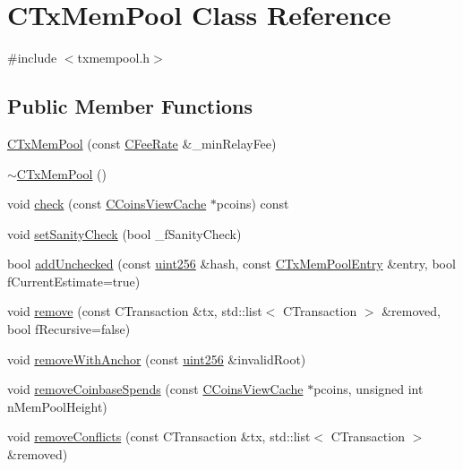 \hypertarget{class_c_tx_mem_pool}{}\section{C\+Tx\+Mem\+Pool Class Reference}
\label{class_c_tx_mem_pool}


{\ttfamily \#include $<$txmempool.\+h$>$}

\subsection*{Public Member Functions}
\begin{DoxyCompactItemize}
\item 
\mbox{\hyperlink{class_c_tx_mem_pool_a82147548cfa962975690d1926b717c1c}{C\+Tx\+Mem\+Pool}} (const \mbox{\hyperlink{class_c_fee_rate}{C\+Fee\+Rate}} \&\+\_\+min\+Relay\+Fee)
\item 
\mbox{\hyperlink{class_c_tx_mem_pool_a038108efea0c4312e5bed2ce064702b2}{$\sim$\+C\+Tx\+Mem\+Pool}} ()
\item 
void \mbox{\hyperlink{class_c_tx_mem_pool_ab30fadfa811829e79accca41da6a8328}{check}} (const \mbox{\hyperlink{class_c_coins_view_cache}{C\+Coins\+View\+Cache}} $\ast$pcoins) const
\item 
void \mbox{\hyperlink{class_c_tx_mem_pool_a1c0edb1fd5f0b02ddac46a6a97dcfd53}{set\+Sanity\+Check}} (bool \+\_\+f\+Sanity\+Check)
\item 
bool \mbox{\hyperlink{class_c_tx_mem_pool_aab557615eb380db41237382bab239f7c}{add\+Unchecked}} (const \mbox{\hyperlink{classuint256}{uint256}} \&hash, const \mbox{\hyperlink{class_c_tx_mem_pool_entry}{C\+Tx\+Mem\+Pool\+Entry}} \&entry, bool f\+Current\+Estimate=true)
\item 
void \mbox{\hyperlink{class_c_tx_mem_pool_a3a497097d9d5f325a2922a3970ac9da2}{remove}} (const C\+Transaction \&tx, std\+::list$<$ C\+Transaction $>$ \&removed, bool f\+Recursive=false)
\item 
void \mbox{\hyperlink{class_c_tx_mem_pool_a16a2a45643106e2612c0f300af7459f7}{remove\+With\+Anchor}} (const \mbox{\hyperlink{classuint256}{uint256}} \&invalid\+Root)
\item 
void \mbox{\hyperlink{class_c_tx_mem_pool_a6d1292640d0b6028bd5c602a6a50a983}{remove\+Coinbase\+Spends}} (const \mbox{\hyperlink{class_c_coins_view_cache}{C\+Coins\+View\+Cache}} $\ast$pcoins, unsigned int n\+Mem\+Pool\+Height)
\item 
void \mbox{\hyperlink{class_c_tx_mem_pool_a11f1bddfbae7c03c6244db322876c0a7}{remove\+Conflicts}} (const C\+Transaction \&tx, std\+::list$<$ C\+Transaction $>$ \&removed)

\end{DoxyCompactItemize}
